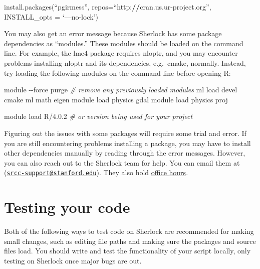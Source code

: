 \documentclass[
]{book}
\newenvironment{Shaded}{\begin{snugshade}}{\end{snugshade}}
\newcommand{\AttributeTok}[1]{\textcolor[rgb]{0.77,0.63,0.00}{#1}}
\newcommand{\CommentTok}[1]{\textcolor[rgb]{0.56,0.35,0.01}{\textit{#1}}}
\newcommand{\ErrorTok}[1]{\textcolor[rgb]{0.64,0.00,0.00}{\textbf{#1}}}
\newcommand{\ExtensionTok}[1]{#1}
\newcommand{\FunctionTok}[1]{\textcolor[rgb]{0.00,0.00,0.00}{#1}}
\newcommand{\NormalTok}[1]{#1}
\newcommand{\SpecialCharTok}[1]{\textcolor[rgb]{0.00,0.00,0.00}{#1}}
\begin{document}
\begin{Shaded}
\begin{Highlighting}[]
\FunctionTok{install.packages}\NormalTok{(“pgirmess”, }\AttributeTok{repos=}\NormalTok{“http}\SpecialCharTok{:}\ErrorTok{//}\NormalTok{cran.us.ur}\SpecialCharTok{{-}}\NormalTok{project.org”, }\AttributeTok{INSTALL\_opts =}\NormalTok{ ‘—no}\SpecialCharTok{{-}}\NormalTok{lock’)}
\end{Highlighting}
\end{Shaded}

You may also get an error message because Sherlock has some package dependencies as ``modules.'' These modules should be loaded on the command line. For example, the lme4 package requires nloptr, and you may encounter problems installing nloptr and its dependencies, e.g.~cmake, normally. Instead, try loading the following modules on the command line before opening R:

\begin{Shaded}
\begin{Highlighting}[]
\ExtensionTok{module} \AttributeTok{{-}{-}force}\NormalTok{ purge }\CommentTok{\# remove any previously loaded modules}
\ExtensionTok{ml}\NormalTok{ load devel cmake}
\ExtensionTok{ml}\NormalTok{ math eigen}
\ExtensionTok{module}\NormalTok{ load physics gdal}
\ExtensionTok{module}\NormalTok{ load physics proj}

\ExtensionTok{module}\NormalTok{ load R/4.0.2 }\CommentTok{\# or version being used for your project}
\end{Highlighting}
\end{Shaded}

Figuring out the issues with some packages will require some trial and error. If you are still encountering problems installing a package, you may have to install other dependencies manually by reading through the error messages. However, you can also reach out to the Sherlock team for help. You can email them at (\href{mailto:srcc-support@stanford.edu}{\nolinkurl{srcc-support@stanford.edu}}). They also hold \href{https://jumpstartsrcc.sites.stanford.edu/events/series/sherlock-office-hours}{office hours}.

\hypertarget{testing-your-code}{%
\section{Testing your code}\label{testing-your-code}}

Both of the following ways to test code on Sherlock are recommended for making small changes, such as editing file paths and making sure the packages and source files load. You should write and test the functionality of your script locally, only testing on Sherlock once major bugs are out.
\end{document}
